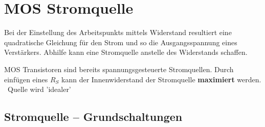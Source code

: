 \section{MOS Stromquelle}
Bei der Einstellung des Arbeitspunkts mittels Widerstand resultiert eine quadratische Gleichung für den Strom und so die Ausgangsspannung eines Verstärkers.
Abhilfe kann eine Stromquelle anstelle des Widerstands schaffen.

MOS Transistoren sind bereits spannungsgesteuerte Stromquellen.
Durch einfügen eines $R_S$ kann der Innenwiderstand der Stromquelle \textbf{maximiert} werden. \textrightarrow\ Quelle wird 'idealer'

\subsection{Stromquelle -- Grundschaltungen}


